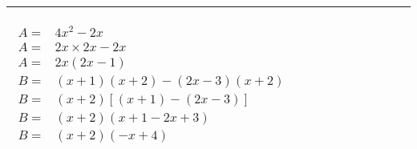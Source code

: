 \documentclass[10pt,a4paper]{article}
\begin{document}
\begin{tabular}{|>{\centering\arraybackslash}p{1.2cm}|>{\raggedright\arraybackslash}p{15.5cm}|>{\centering\arraybackslash}p{0.8cm}|}
\begin{exemple}
     \begin{multicols}{2}
       $\begin{array}{ll}
        A = & 4x^2 - 2x \\
        A = & 2x\times 2x - 2x\\
        A = & 2x(2x-1)
    \end{array}$
    \vfill
    \columnbreak
     $\begin{array}{ll}
        B = & (x + 1)(x + 2) - (2x - 3)(x + 2) \\
        B = & (x + 2)[(x + 1) - (2x - 3)] \\
        B = & (x + 2)(x + 1 - 2x + 3) \\
        B = & (x + 2)(-x + 4) \\
    \end{array}$
  \end{multicols}
\end{exemple}

& \\
\hline

\end{tabular}
\end{document}
